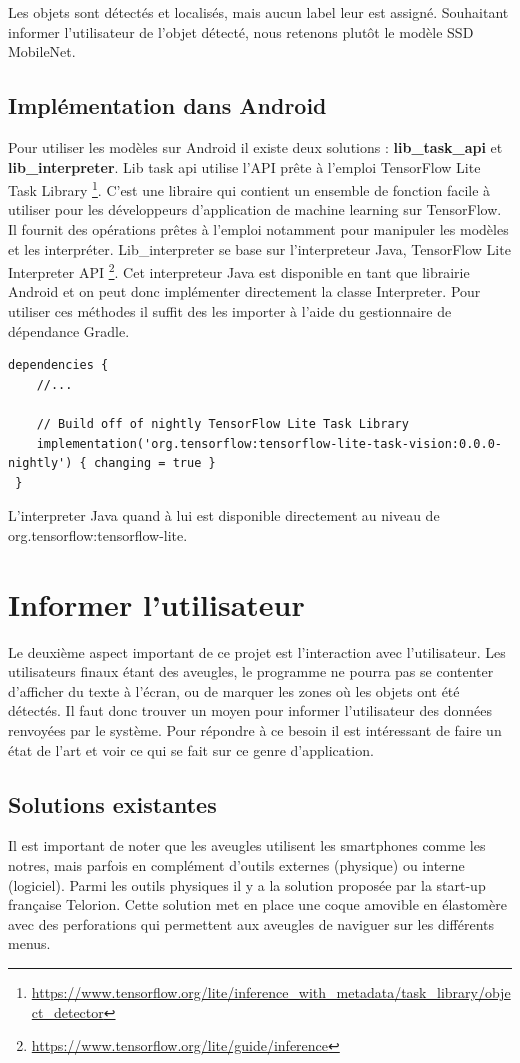 \documentclass[UTF8]{EPURapport}
\begin{document}
Les objets sont détectés et localisés, mais aucun label leur est assigné. Souhaitant informer l'utilisateur de l'objet détecté, nous retenons plutôt le modèle SSD MobileNet.

\subsection{Implémentation dans Android}
Pour utiliser les modèles sur Android il existe deux solutions : \textbf{lib\_task\_api} et \textbf{lib\_interpreter}. Lib task api utilise l'API prête à l'emploi TensorFlow Lite Task Library \footnote{\url{https://www.tensorflow.org/lite/inference_with_metadata/task_library/object_detector}}. C'est une libraire qui contient un ensemble de fonction facile à utiliser pour les développeurs d'application de machine learning sur TensorFlow. Il fournit des opérations prêtes à l'emploi notamment pour manipuler les modèles et les interpréter. Lib\_interpreter se base sur l'interpreteur Java, TensorFlow Lite Interpreter API \footnote{\url{https://www.tensorflow.org/lite/guide/inference}}. Cet interpreteur Java est disponible en tant que librairie Android et on peut donc implémenter directement la classe Interpreter.
Pour utiliser ces méthodes il suffit des les importer à l'aide du gestionnaire de dépendance Gradle.
\begin{lstlisting}
dependencies {
    //...

    // Build off of nightly TensorFlow Lite Task Library
    implementation('org.tensorflow:tensorflow-lite-task-vision:0.0.0-nightly') { changing = true }
 }
\end{lstlisting}

L'interpreter Java quand à lui est disponible directement au niveau de org.tensorflow:tensorflow-lite.

\section{Informer l'utilisateur}
Le deuxième aspect important de ce projet est l'interaction avec l'utilisateur. Les utilisateurs finaux étant des aveugles, le programme ne pourra pas se contenter d'afficher du texte à l'écran, ou de marquer les zones où les objets ont été détectés. Il faut donc trouver un moyen pour informer l'utilisateur des données renvoyées par le système. Pour répondre à ce besoin il est intéressant de faire un état de l'art et voir ce qui se fait sur ce genre d'application.

\subsection{Solutions existantes}
Il est important de noter que les aveugles utilisent les smartphones comme les notres, mais parfois en complément d'outils externes (physique) ou interne (logiciel). Parmi les outils physiques il y a la solution proposée par la start-up française Telorion. Cette solution met en place une coque amovible en élastomère avec des perforations qui permettent aux aveugles de naviguer sur les différents menus.
\end{document}

